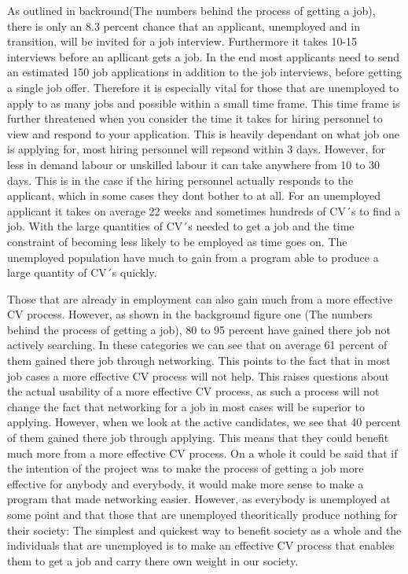 As outlined in backround(The numbers behind the process of getting a job), there is only an 8.3 percent chance that an applicant, unemployed and in transition, will be invited for a job interview.
Furthermore it takes 10-15 interviews before an apllicant gets a job.
In the end most applicants need to send an estimated 150 job applications in addition to the job interviews, before getting a single job offer.
Therefore it is especially vital for those that are unemployed to apply to as many jobs and possible within a small time frame. 
This time frame is further threatened when you consider the time it takes for hiring personnel to view and respond to your application.
This is heavily dependant on what job one is applying for, most hiring personnel will repsond within 3 days. 
However, for less in demand labour or unskilled labour it can take anywhere from 10 to 30 days. 
This is in the case if the hiring personnel actually responds to the applicant, which in some cases they dont bother to at all.
For an unemployed applicant it takes on average 22 weeks and sometimes hundreds of CV´s to find a job. 
With the large quantities of CV´s needed to get a job and the time constraint of becoming less likely to be employed as time goes on.
The unemployed population have much to gain from a program able to produce a large quantity of CV´s quickly.

Those that are already in employment can also gain much from a more effective CV process.
However, as shown in the background figure one (The numbers behind the process of getting a job), 80 to 95 percent have gained there job not actively searching.
In these categories we can see that on average 61 percent of them gained there job through networking. 
This points to the fact that in most job cases a more effective CV process will not help.
This raises questions about the actual usability of a more effective CV process, as such a process will not change the fact that networking for a job in most cases will be superior to applying.
However, when we look at the active candidates, we see that 40 percent of them gained there job through applying. 
This means that they could benefit much more from a more effective CV process.
On a whole it could be said that if the intention of the project was to make the process of getting a job more effective for anybody and everybody, it would make more sense to make a program that made networking easier.
However, as everybody is unemployed at some point and that those that are unemployed theoritically produce nothing for their society:
The simplest and quickest way to benefit society as a whole and the individuals that are unemployed is to make an effective CV process that enables them to get a job and carry there own weight in our society.


